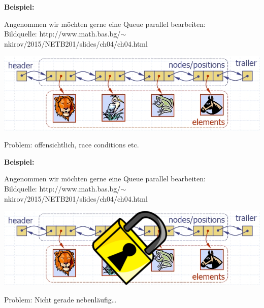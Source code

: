 \documentclass{beamer}
\begin{document}

\begin{frame}

\textbf{Beispiel:}\bigskip

Angenommen wir möchten gerne eine Queue parallel bearbeiten:\\
\tiny Bildquelle: http://www.math.bas.bg/$\sim$nkirov/2015/NETB201/slides/ch04/ch04.html \normalsize

\begin{center}
\includegraphics[scale=0.35]{liste_frei.jpg} 
\end{center}
\pause

Problem: offensichtlich, race conditions etc.

\end{frame}


\begin{frame}

\textbf{Beispiel:}\bigskip

Angenommen wir möchten gerne eine Queue parallel bearbeiten:\\
\tiny Bildquelle: http://www.math.bas.bg/$\sim$nkirov/2015/NETB201/slides/ch04/ch04.html \normalsize

\begin{center}
\includegraphics[scale=0.35]{liste_locked.jpg} 
\end{center}
\pause

Problem: Nicht gerade nebenläufig\dots

\end{frame}
\end{document}
